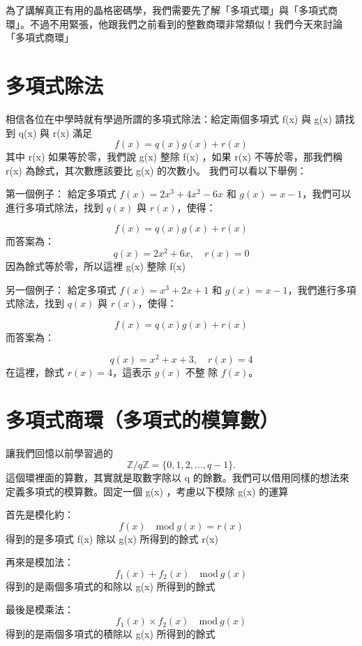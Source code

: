 \documentclass[
]{article}
\author{}
\date{}
\begin{document}
為了講解真正有用的晶格密碼學，我們需要先了解「多項式環」與「多項式商環」。不過不用緊張，他跟我們之前看到的整數商環非常類似！我們今天來討論「多項式商環」

\hypertarget{ux591aux9805ux5f0fux9664ux6cd5}{%
\section{多項式除法}\label{ux591aux9805ux5f0fux9664ux6cd5}}

相信各位在中學時就有學過所謂的多項式除法：給定兩個多項式 f(x) 與 g(x)
請找到 q(x) 與 r(x) 滿足 \[
f(x) = q(x)g(x)+r(x)
\] 其中 r(x) 如果等於零，我們說 g(x) 整除 f(x) ，如果 r(x)
不等於零，那我們稱 r(x) 為餘式，其次數應該要比 g(x) 的次數小。
我們可以看以下舉例：

第一個例子： 給定多項式 \(f(x) = 2x^3 + 4x^2 - 6x\) 和
\(g(x) = x - 1\)，我們可以進行多項式除法，找到 \(q(x)\) 與
\(r(x)\)，使得：

\[
f(x) = q(x)g(x) + r(x)
\] 而答案為： \[
q(x) = 2x^{2} +6x, \quad r(x) = 0
\] 因為餘式等於零，所以這裡 g(x) 整除 f(x)

另一個例子： 給定多項式 \(f(x) = x^3 + 2x + 1\) 和
\(g(x) = x - 1\)，我們進行多項式除法，找到 \(q(x)\) 與 \(r(x)\)，使得：

\[
f(x) = q(x)g(x) + r(x)
\] 而答案為：

\[
q(x) = x^{2} + x + 3,\quad r(x) = 4
\] 在這裡，餘式 \(r(x) = 4\)，這表示 \(g(x)\) 不整 除 \(f(x)\)。

\hypertarget{ux591aux9805ux5f0fux5546ux74b0ux591aux9805ux5f0fux7684ux6a21ux7b97ux6578}{%
\section{多項式商環（多項式的模算數）}\label{ux591aux9805ux5f0fux5546ux74b0ux591aux9805ux5f0fux7684ux6a21ux7b97ux6578}}

讓我們回憶以前學習過的 \[
\mathbb{Z}/q\mathbb{Z} = \{ 0,1,2,\dots,q-1 \}.
\] 這個環裡面的算數，其實就是取數字除以 q
的餘數。我們可以借用同樣的想法來定義多項式的模算數。固定一個 g(x)
，考慮以下模除 g(x) 的運算

首先是模化約： \[
f(x)  \quad \mathrm{mod} \ g(x)  = r(x)
\] 得到的是多項式 f(x) 除以 g(x) 所得到的餘式 r(x)

再來是模加法： \[
f_{1}(x)+f_{2}(x) \quad \mathrm{mod} \ g(x)  
\] 得到的是兩個多項式的和除以 g(x) 所得到的餘式

最後是模乘法： \[
f_{1}(x)\times f_{2}(x) \quad \mathrm{mod} \ g(x)  
\] 得到的是兩個多項式的積除以 g(x) 所得到的餘式
\end{document}
